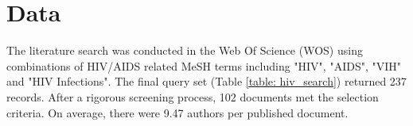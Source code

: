 
\section{Data}
\label{sec:hiv_data}
The literature search was conducted in the Web Of Science (WOS) using combinations of HIV/AIDS related MeSH terms including "HIV", "AIDS", "VIH" and "HIV Infections". 
The final query set (Table \ref{table: hiv_search}) returned 237 records. After a rigorous screening process, 102 documents met the selection criteria. On average, there were 9.47 authors per published document.

